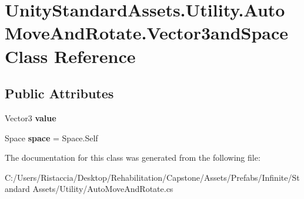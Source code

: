 \hypertarget{class_unity_standard_assets_1_1_utility_1_1_auto_move_and_rotate_1_1_vector3and_space}{}\section{Unity\+Standard\+Assets.\+Utility.\+Auto\+Move\+And\+Rotate.\+Vector3and\+Space Class Reference}
\label{class_unity_standard_assets_1_1_utility_1_1_auto_move_and_rotate_1_1_vector3and_space}
\subsection*{Public Attributes}
\begin{DoxyCompactItemize}
\item 
\mbox{\label{class_unity_standard_assets_1_1_utility_1_1_auto_move_and_rotate_1_1_vector3and_space_aab8bd7cedeb6c93b687a5693aeda36de}} 
Vector3 {\bfseries value}
\item 
\mbox{\label{class_unity_standard_assets_1_1_utility_1_1_auto_move_and_rotate_1_1_vector3and_space_a2530d3818ba403e264d03c0d06014f5b}} 
Space {\bfseries space} = Space.\+Self
\end{DoxyCompactItemize}


The documentation for this class was generated from the following file\+:\begin{DoxyCompactItemize}
\item 
C\+:/\+Users/\+Ristaccia/\+Desktop/\+Rehabilitation/\+Capstone/\+Assets/\+Prefabs/\+Infinite/\+Standard Assets/\+Utility/Auto\+Move\+And\+Rotate.\+cs\end{DoxyCompactItemize}
